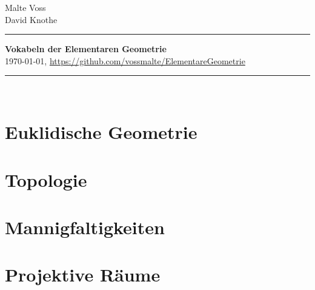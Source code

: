 \documentclass[a4paper,11pt]{article} %
\theoremstyle{costum} %
\begin{document}
%
\hfill \parbox{24mm}
{
Malte Voss\\
David Knothe\\
}

\rule{\textwidth}{1pt}                                   %
%
\begin{center}
\textbf{
Vokabeln der Elementaren Geometrie \\[1ex] %
}
{
%
%
\today, \url{https://github.com/vossmalte/ElementareGeometrie}
}
\end{center}
%
\rule{\textwidth}{1pt}\\                                 %
\section{Euklidische Geometrie}

\vspace{3ex}
\section{Topologie}

\vspace{3ex}
\section{Mannigfaltigkeiten}

\vspace{3ex}
\section{Projektive Räume}

\vspace{3ex}

\vspace*{\fill} %

\begin{flushright}
\end{flushright}
\end{document}

